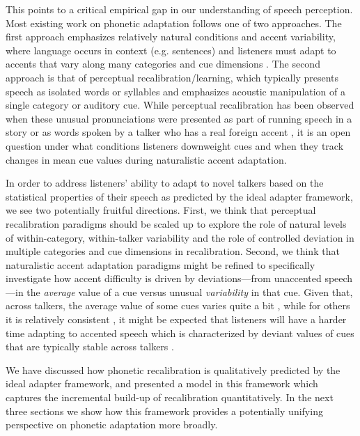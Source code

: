 This points to a critical empirical gap in our understanding of speech perception. Most existing work on phonetic adaptation follows one of two approaches. The first approach emphasizes relatively natural conditions and accent variability, where language occurs in context (e.g. sentences) and listeners must adapt to accents that vary along many categories and cue dimensions \cite{Baese-berk2013,Bradlow2008,Clarke2004,Sidaras2009}.  The second approach is that of perceptual recalibration/learning, which typically presents speech as isolated words or syllables and emphasizes acoustic manipulation of a single category or auditory cue.  While perceptual recalibration has been observed when these unusual pronunciations were presented as part of running speech in a story \cite{Eisner2006} or as words spoken by a talker who has a real foreign accent \cite{Reinisch2014}, it is an open question under what conditions listeners downweight cues and when they track changes in mean cue values during naturalistic accent adaptation.

In order to address listeners' ability to adapt to novel talkers based on the statistical properties of their speech as predicted by the ideal adapter framework, we see two potentially fruitful directions.  First, we think that perceptual recalibration paradigms should be scaled up to explore the role of natural levels of within-category, within-talker variability and the role of controlled deviation in multiple categories and cue dimensions in recalibration.  Second, we think that naturalistic accent adaptation paradigms might be refined to specifically investigate how accent difficulty is driven by deviations---from unaccented speech---in the \emph{average} value of a cue versus unusual \emph{variability} in that cue.  Given that, across talkers, the average value of some cues varies quite a bit \cite{Newman2001}, while for others it is relatively consistent \cite{Allen2003}, it might be expected that listeners will have a harder time adapting to accented speech which is characterized by deviant values of cues that are typically stable across talkers \cite<like VOT>{Sumner2011}.

We have discussed how phonetic recalibration is qualitatively predicted by the ideal adapter framework, and presented a model in this framework which captures the incremental build-up of recalibration quantitatively.  In the next three sections we show how this framework provides a potentially unifying perspective on phonetic adaptation more broadly.



